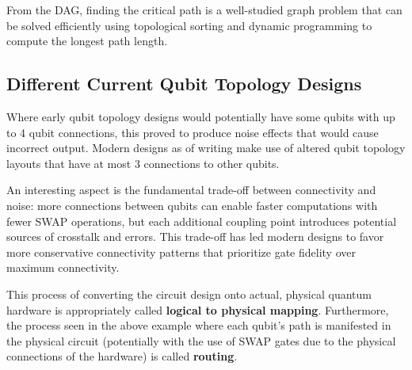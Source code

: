 \vspace{0.3cm}

From the DAG, finding the critical path is a well-studied graph problem that
can be solved efficiently using topological sorting and dynamic programming
to compute the longest path length.

\subsection*{Different Current Qubit Topology Designs}

Where early qubit topology designs would potentially have some qubits with
up to 4 qubit connections, this proved to produce noise effects that would
cause incorrect output. Modern designs as of writing make use of altered
qubit topology layouts that have at most 3 connections to other qubits.

An interesting aspect is the fundamental trade-off between connectivity and
noise: more connections between qubits can enable faster computations with
fewer SWAP operations, but each additional coupling point introduces
potential sources of crosstalk and errors. This trade-off has led modern
designs to favor more conservative connectivity patterns that prioritize gate
fidelity over maximum connectivity.

This process of converting the circuit design onto actual, physical quantum
hardware is appropriately called \textbf{logical to physical mapping}.
Furthermore, the process seen in the above example where each qubit's path is
manifested in the physical circuit (potentially with the use of SWAP gates
due to the physical connections of the hardware) is called \textbf{routing}.

\vspace{0.3cm}


